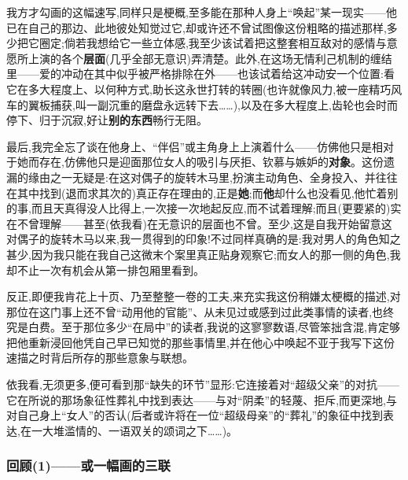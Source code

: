 我方才勾画的这幅速写,同样只是梗概,至多能在那种人身上“唤起”某一现实——他已在自己的那边、此地彼处知觉过它,却或许还不曾试图像这份粗略的描述那样,多少把它圈定;倘若我想给它一些立体感,我至少该试着把这整套相互敌对的感情与意愿所上演的各个\textbf{层面}(几乎全部无意识)弄清楚。此外,在这场无情利己机制的缠结里——爱的冲动在其中似乎被严格排除在外——也该试着给这冲动安一个位置:看它在多大程度上、以何种方式,助长这永世打转的转圈(也许就像风力,被一座精巧风车的翼板捕获,叫一副沉重的磨盘永远转下去……),以及在多大程度上,齿轮也会时而停下、归于沉寂,好让\textbf{别的东西}畅行无阻。

最后,我完全忘了谈在他身上、“伴侣”或主角身上上演着什么——仿佛他只是相对于她而存在,仿佛他只是迎面那位女人的吸引与厌拒、钦慕与嫉妒的\textbf{对象}。这份遗漏的缘由之一无疑是:在这对偶子的旋转木马里,扮演主动角色、全身投入、并往往在其中找到(退而求其次的)真正存在理由的,正是\textbf{她};而\textbf{他}却什么也没看见,他忙着别的事,而且\dmark{}天真得没人比得上,一次接一次地起反应,而不试着理解;而且(更要紧的)实在不曾理解——甚至(依我看)在无意识的层面也不曾。至少,这是自我开始留意这对偶子的旋转木马以来,我一贯得到的印象!不过同样真确的是:我对男人的角色知之甚少,因为我只能在我自己这微末个案里真正贴身观察它;而女人的那一侧的角色,我却不止一次有机会从第一排包厢里看到。

反正,即便我肯花上十页、乃至整整一卷的工夫,来充实我这份稍嫌太梗概的描述,对那位在这门事上还不曾“动用他的官能”、从未见过或感到过此类事情的读者,也终究是白费。至于那位多少“在局中”的读者,我说的这寥寥数语,尽管笨拙含混,肯定够把他重新浸回他凭自己早已知觉的那些事情里,并在他心中唤起不亚于我写下这份速描之时背后所存的那些意象与联想。

依我看,无须更多,便可看到那“缺失的环节”显形:它连接着对“超级父亲”的对抗——它在所说的那场象征性葬礼中找到表达——与对“阴柔”的轻蔑、拒斥,而更深地,与对自己身上“女人”的否认(后者或许将在一位“超级母亲”的“葬礼”的象征中找到表达,在一大堆滥情的、一语双关的颂词之下……)。

\subsubsection*{回顾(1)——或一幅画的三联}
\label{ch18:local:h36}

